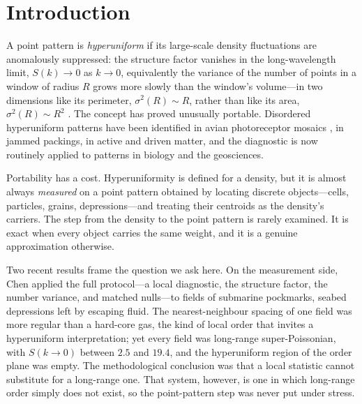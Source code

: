 \documentclass[aps,pre,twocolumn,superscriptaddress,floatfix,longbibliography]{revtex4-2}
\begin{document}
\section{Introduction}

A point pattern is \emph{hyperuniform} if its large-scale density fluctuations
are anomalously suppressed: the structure factor vanishes in the
long-wavelength limit, $S(k) \to 0$ as $k \to 0$, equivalently the variance of
the number of points in a window of radius $R$ grows more slowly than the
window's volume---in two dimensions like its perimeter, $\sigma^2(R) \sim R$,
rather than like its area, $\sigma^2(R) \sim R^2$
\cite{TorquatoStillinger2003,Torquato2018}. The concept has proved unusually
portable. Disordered hyperuniform patterns have been identified in avian
photoreceptor mosaics \cite{Jiao2014}, in jammed packings, in active and
driven matter, and the diagnostic is now routinely applied to patterns in
biology and the geosciences.

Portability has a cost. Hyperuniformity is defined for a density, but it is
almost always \emph{measured} on a point pattern obtained by locating discrete
objects---cells, particles, grains, depressions---and treating their centroids
as the density's carriers. The step from the density to the point pattern is
rarely examined. It is exact when every object carries the same weight, and it
is a genuine approximation otherwise.

Two recent results frame the question we ask here. On the measurement side,
Chen \cite{Chen2026} applied the full protocol---a local diagnostic, the
structure factor, the number variance, and matched nulls---to fields of
submarine pockmarks, seabed depressions left by escaping fluid. The
nearest-neighbour spacing of one field was more regular than a hard-core gas,
the kind of local order that invites a hyperuniform interpretation; yet every
field was long-range super-Poissonian, with $S(k \to 0)$ between $2.5$ and
$19.4$, and the hyperuniform region of the order plane was empty. The
methodological conclusion was that a local statistic cannot substitute for a
long-range one. That system, however, is one in which long-range order simply
does not exist, so the point-pattern step was never put under stress.
\end{document}
